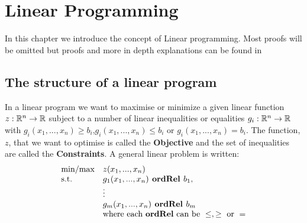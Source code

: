 \chapter{Linear Programming}
In this chapter we introduce the concept of Linear programming. Most proofs will be omitted but proofs and more in depth explanations can be found in ~\cite{vanderbei2015linear}
\section{The structure of a linear program}
In a linear program we want to maximise or minimize a given linear function $z:\mathbb{R}^n \rightarrow \mathbb{R}$ subject to a number of linear inequalities or equalities $g_i:\mathbb{R}^n \rightarrow \mathbb{R}$ with $g_i(x_1,...,x_n)\geq b_i$,$g_i(x_1,...,x_n)\leq b_i$ or $g_i(x_1,...,x_n)= b_i$. The function, $z$, that we want to optimise is called the \textbf{Objective} and the set of inequalities are called the \textbf{Constraints}. A general linear problem is written:
\begin{align}\label{lpform}
\begin{array}{ll@{}ll}
\text{min/max} &z(x_1,...,x_n)&\\
\text{s.t.} &g_1(x_1,...,x_n) \textbf{ ordRel } b_1,&\\
&\vdots&\\
&g_m(x_1,...,x_n) \textbf{ ordRel } b_m&\\
&\text{where each \textbf{ordRel} can be }\leq,\geq \text{ or } =&
\end{array}
\end{align}

